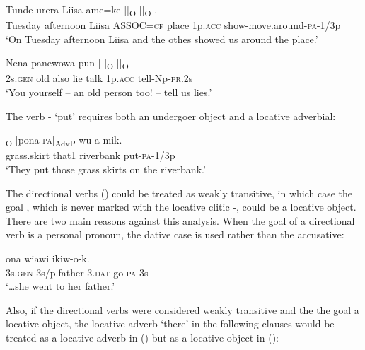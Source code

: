 \ea%
\label{ex:x1838}
\gll Tunde urera Liisa ame=ke []\textsubscript{O} []\textsubscript{O} \textstyleEmphasizedVernacularWords{-}\textstyleEmphasizedVernacularWords{-}.\\
Tuesday afternoon Liisa ASSOC=\textsc{cf} place 1p.\textsc{acc} show-move.around-\textsc{pa}-1/3p\\
\glt`On Tuesday afternoon Liisa and the othes showed us around the place.'
\z

\ea%
\label{ex:x943}
\gll Nena panewowa pun [ ]\textsubscript{O}  []\textsubscript{O}  \\
2s.\textsc{gen} old also lie talk 1p.\textsc{acc} tell-Np-\textsc{pr}.2s\\
\glt`You yourself -- an old person too! -- tell us lies.'
\z

The verb - `put' requires both an undergoer object and a locative adverbial: 

\ea%
\label{ex:x1837}
\textsubscript{O} [pona-\textsc{pa}]\textsubscript{AdvP} wu-a-mik. \\
grass.skirt that1 riverbank put-\textsc{pa}-1/3p\\
\glt`They put those grass skirts on the riverbank.'
\z

The directional verbs () could be treated as weakly transitive, in which case the goal , which is never marked with the locative clitic -, could be a locative object. There are two main reasons against this analysis. When the goal of a directional verb is a personal pronoun, the dative case is used rather than the accusative:

\ea%
\label{ex:x1870}
\gll {\dots}ona wiawi  ikiw-o-k. \\
3s.\textsc{gen} 3s/p.father 3.\textsc{dat} go-\textsc{pa}-3s\\
\glt`{\dots}she went to her father.'
\z

Also, if the directional verbs were considered weakly transitive and the the goal a locative object, the locative adverb  `there' in the following clauses would be treated as a locative adverb in () but as a locative object in ():

